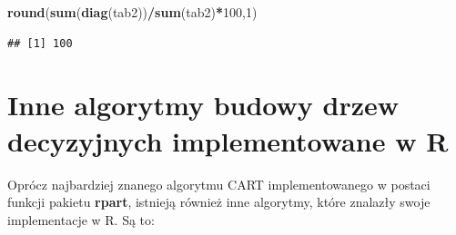 \documentclass[
]{book}
\newenvironment{Shaded}{\begin{snugshade}}{\end{snugshade}}
\newcommand{\DecValTok}[1]{\textcolor[rgb]{0.00,0.00,0.81}{#1}}
\newcommand{\FunctionTok}[1]{\textcolor[rgb]{0.13,0.29,0.53}{\textbf{#1}}}
\newcommand{\NormalTok}[1]{#1}
\newcommand{\SpecialCharTok}[1]{\textcolor[rgb]{0.81,0.36,0.00}{\textbf{#1}}}
\theoremstyle{plain}
\theoremstyle{definition}
\theoremstyle{definition}
\theoremstyle{definition}
\theoremstyle{definition}
\theoremstyle{definition}
\theoremstyle{remark}
\begin{document}
\begin{Shaded}
\begin{Highlighting}[]
\FunctionTok{round}\NormalTok{(}\FunctionTok{sum}\NormalTok{(}\FunctionTok{diag}\NormalTok{(tab2))}\SpecialCharTok{/}\FunctionTok{sum}\NormalTok{(tab2)}\SpecialCharTok{*}\DecValTok{100}\NormalTok{,}\DecValTok{1}\NormalTok{)}
\end{Highlighting}
\end{Shaded}

\begin{verbatim}
## [1] 100
\end{verbatim}

\section{\texorpdfstring{Inne algorytmy budowy drzew decyzyjnych implementowane w \textbf{R}}{Inne algorytmy budowy drzew decyzyjnych implementowane w R}}\label{inne-algorytmy-budowy-drzew-decyzyjnych-implementowane-w-r}

Oprócz najbardziej znanego algorytmu CART implementowanego w postaci funkcji pakietu \textbf{rpart}, istnieją również inne algorytmy, które znalazły swoje implementacje w R. Są to:
\end{document}
